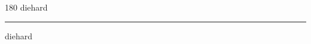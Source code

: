 
\begin{frame}
\begin{center}
\begin{turn}{180}
{\fontsize{2.5cm}{1em}\selectfont diehard}
\end{turn}
\vspace{1em}\par  
\hrule
\vspace{1em}\par  
{\fontsize{2.5cm}{1em}\selectfont diehard}
\end{center}
\end{frame}
